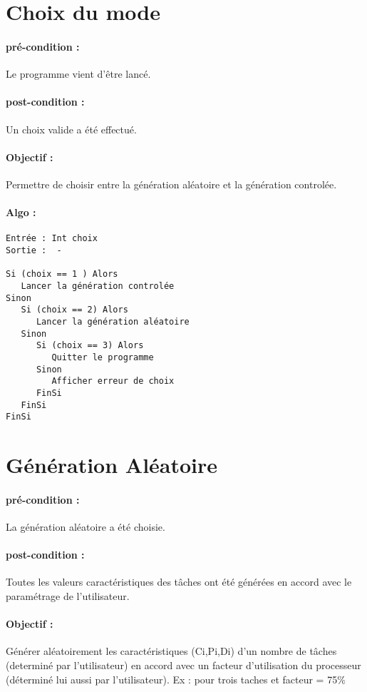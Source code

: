 \section{Choix du mode}
    \paragraph{pré-condition :} Le programme vient d’être lancé.
    \paragraph{post-condition :} Un choix valide a été effectué.
    \paragraph{Objectif :} Permettre de choisir entre la génération aléatoire et la génération controlée.
    \paragraph{Algo :}
\begin{verbatim} 
Entrée : Int choix
Sortie :  -

Si (choix == 1 ) Alors
   Lancer la génération controlée
Sinon
   Si (choix == 2) Alors
      Lancer la génération aléatoire 
   Sinon
      Si (choix == 3) Alors
         Quitter le programme
      Sinon
         Afficher erreur de choix 
      FinSi
   FinSi
FinSi
\end{verbatim} 

\newpage
\section{Génération Aléatoire}
\paragraph{pré-condition :} La génération aléatoire a été choisie.
\paragraph{post-condition :} Toutes les valeurs caractéristiques des tâches ont été générées en accord avec le paramétrage de l’utilisateur.


\paragraph{Objectif :} Générer aléatoirement les caractéristiques (Ci,Pi,Di) d’un nombre de tâches (determiné par l’utilisateur) en accord avec un facteur d’utilisation du processeur (déterminé lui aussi par l’utilisateur).
Ex : pour trois taches et facteur = 75\% \\ 


